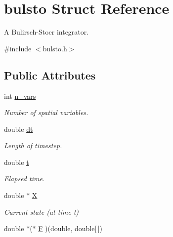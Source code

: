 \hypertarget{structbulsto}{\section{bulsto Struct Reference}
\label{structbulsto}
}


A Bulirsch-\/\-Stoer integrator.  




{\ttfamily \#include $<$bulsto.\-h$>$}

\subsection*{Public Attributes}
\begin{DoxyCompactItemize}
\item 
\hypertarget{structbulsto_a4644ac965956cf8a34a102aa42882fa9}{int \hyperlink{structbulsto_a4644ac965956cf8a34a102aa42882fa9}{n\-\_\-vars}}\label{structbulsto_a4644ac965956cf8a34a102aa42882fa9}

\begin{DoxyCompactList}\small\item\em Number of spatial variables. \end{DoxyCompactList}\item 
\hypertarget{structbulsto_a36056008e687384ae776b011c92a8536}{double \hyperlink{structbulsto_a36056008e687384ae776b011c92a8536}{dt}}\label{structbulsto_a36056008e687384ae776b011c92a8536}

\begin{DoxyCompactList}\small\item\em Length of timestep. \end{DoxyCompactList}\item 
\hypertarget{structbulsto_a3553c5b225bd39d4f8e797ea958f8b3b}{double \hyperlink{structbulsto_a3553c5b225bd39d4f8e797ea958f8b3b}{t}}\label{structbulsto_a3553c5b225bd39d4f8e797ea958f8b3b}

\begin{DoxyCompactList}\small\item\em Elapsed time. \end{DoxyCompactList}\item 
\hypertarget{structbulsto_a110de2f76d66addd0c11b3c1cf896557}{double $\ast$ \hyperlink{structbulsto_a110de2f76d66addd0c11b3c1cf896557}{X}}\label{structbulsto_a110de2f76d66addd0c11b3c1cf896557}

\begin{DoxyCompactList}\small\item\em Current state (at time t) \end{DoxyCompactList}\item 
\hypertarget{structbulsto_ade5a625cad24ed4bccebf9dc4c9ce52c}{double $\ast$($\ast$ \hyperlink{structbulsto_ade5a625cad24ed4bccebf9dc4c9ce52c}{F} )(double, double\mbox{[}$\,$\mbox{]})}\label{structbulsto_ade5a625cad24ed4bccebf9dc4c9ce52c}


\end{DoxyCompactItemize}
